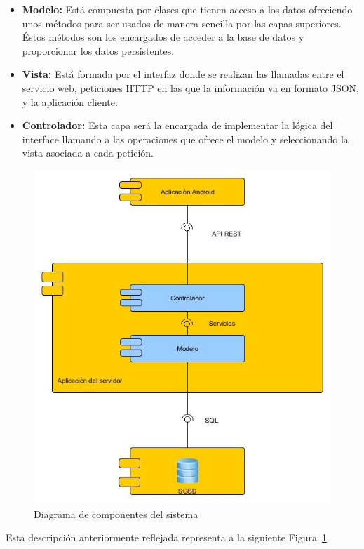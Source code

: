\begin{itemize}
\item \textbf{Modelo:}
Está compuesta por clases que tienen acceso a los datos ofreciendo unos métodos para ser usados de manera sencilla por las capas superiores. Éstos métodos son los encargados de acceder a la base de datos y proporcionar los datos persistentes.
\item \textbf{Vista:}
Está formada por el interfaz donde se realizan las llamadas entre el servicio web, peticiones HTTP en las que la información va en formato JSON, y la aplicación cliente.
\item \textbf{Controlador:}
Esta capa será la encargada de implementar la lógica del interface llamando a las operaciones que ofrece el modelo y seleccionando la vista asociada a cada petición.
\end{itemize}
\begin{figure}
		\centering
		\includegraphics[width=\textwidth] {componentes.jpg}
		\caption{Diagrama de componentes del sistema }\label{fig:componentes}
	\end{figure}
 Esta descripción anteriormente reflejada representa a la siguiente Figura~\ref{fig:componentes}
